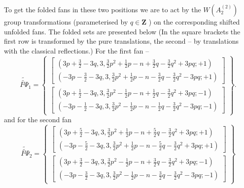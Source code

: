 \documentclass{article}
\begin{document}
To get the folded fans in these two positions we are to act by the $W\left(
A_{2}^{\left( 2\right) }\right) $ group transformations (parameterised by $%
q\in \mathbf{Z}$ ) on the corresponding shifted unfolded fans. The folded
sets are presented below (In the square brackets the first row is
transformed by the pure translations, the second -- by translations with the
classical reflections.) For the first fan -- 
\begin{equation*}
\widetilde{\widetilde{F\Psi }}_{1}=\left\{ 
\begin{array}{c}
\left[ 
\begin{array}{c}
\left( 3p+\frac{3}{2}-3q,3,\frac{3}{2}p^{2}+\frac{1}{2}p-n+\frac{3}{2}q-%
\frac{3}{2}q^{2}+3pq;+1\right) \\ 
\left( -3p-\frac{3}{2}-3q,3,\frac{3}{2}p^{2}+\frac{1}{2}p-n-\frac{3}{2}q-%
\frac{3}{2}q^{2}-3pq;+1\right)
\end{array}
\right] \\ 
\left[ 
\begin{array}{c}
\left( 3p+\frac{1}{2}-3q,3,\frac{3}{2}p^{2}-\frac{1}{2}p-n+\frac{1}{2}q-%
\frac{3}{2}q^{2}+3pq;-1\right) \\ 
\left( -3p-\frac{1}{2}-3q,3,\frac{3}{2}p^{2}-\frac{1}{2}p-n-\frac{1}{2}q-%
\frac{3}{2}q^{2}-3pq;-1\right)
\end{array}
\right]
\end{array}
\right\} .
\end{equation*}
and for the second fan 
\begin{equation*}
\widetilde{\widetilde{F\Psi }}_{2}=\left\{ 
\begin{array}{c}
\left[ 
\begin{array}{c}
\left( 3p+\frac{5}{2}-3q,3,\frac{3}{2}p^{2}+\frac{1}{2}p-n+\frac{5}{2}q-%
\frac{3}{2}q^{2}+3pq;+1\right) \\ 
\left( -3p-\frac{5}{2}-3q,3,\frac{3}{2}p^{2}+\frac{1}{2}p-n-\frac{5}{2}q-%
\frac{3}{2}q^{2}+3pq;+1\right)
\end{array}
\right] \\ 
\left[ 
\begin{array}{c}
\left( 3p+\frac{3}{2}-3q,3,\frac{3}{2}p^{2}-\frac{1}{2}p-n+\frac{3}{2}q-%
\frac{3}{2}q^{2}+3pq;-1\right) \\ 
\left( -3p-\frac{3}{2}-3q,3,\frac{3}{2}p^{2}-\frac{1}{2}p-n-\frac{3}{2}q-%
\frac{3}{2}q^{2}-3pq;-1\right)
\end{array}
\right]
\end{array}
\right\}
\end{equation*}
\end{document}
